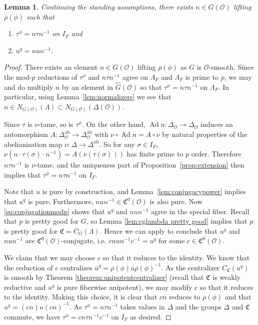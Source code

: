 \documentclass[11pt, letterpaper,english]{amsart}
\theoremstyle{plain}
\newtheorem{lemma}[lem]{Lemma}
\theoremstyle{definition}
\numberwithin{equation}{section}
\numberwithin{lem}{section}
\newcommand{\fC}{\mathfrak{C}}
\newcommand{\cO}{\mathcal{O}}
\newcommand{\rhobar}{{\overline{\rho}}}
\newcommand{\ab}{\textrm{ab}}
\DeclareMathOperator{\Ad}{Ad}
\newcommand{\cent}[2]{C_{#1}(#2)}
\newcommand{\Ld}{\Lambda}
\newcommand{\Dt}{\Delta}
\begin{document}
\begin{lemma} \label{lemma:nlifting}
Continuing the standing assumptions, there exists $n \in G(\cO)$ lifting $\rhobar(\phi)$ such that 
\begin{enumerate}
    \item $\tau^\phi = n \tau n^{-1}$ on $I_F$ and
    \item  $u^q = n u n^{-1}$.
\end{enumerate}
\end{lemma}

\begin{proof}
There exists an element $n \in G(\cO)$ lifting $\rhobar(\phi)$ as $G$ is $\cO$-smooth. Since the mod-$p$ reductions of $\tau^{\phi}$ and $n \tau n^{-1}$ agree on $\Ld_F$ and $\Ld_F$ is prime to $p$, we may and do multiply $n$ by an element in $\widehat G(\cO)$ so that $\tau^{\phi}=n \tau n^{-1}$ on $\Ld_F$. In particular, using Lemma~\ref{lem:normalizers} we see that 
$n \in N_{G(\cO)}(\Ld) \subset N_{G(\cO)}(\Dt(\cO))$.

Since $\tau$ is $\nu$-tame, so is $\tau^{\phi}$. On the other hand, $\Ad n: \Dt_{\cO} \to \Dt_{\cO}$ induces an automorphism $A: \Dt^{\ab}_{\cO} \to \Dt^{\ab}_{\cO}$ with $\nu \circ \Ad n = A \circ \nu$ by natural properties of the abelianization map $\nu: \Dt \to \Dt^{\ab}$. So for any $\sigma \in I_F$, $\nu(n \cdot \tau(\sigma) \cdot n^{-1})=A(\nu(\tau(\sigma)))$ has finite prime to $p$ order. Therefore $n \tau n^{-1}$ is $\nu$-tame, and the uniqueness part of Proposition~\ref{prop:extension} then implies that $\tau^{\phi}=n \tau n^{-1}$ on $I_F$. 


Note that $u$ is pure by construction, and Lemma~\ref{lem:conjugacypower} implies that $u^q$ is pure. Furthermore, $n u n^{-1} \in \fC^0(\cO)$ is also pure.  
Now \eqref{eq:conjugationmodp} shows that $u^q$ and $n u n^{-1}$ agree in the special fiber.
Recall that $p$ is pretty good for $G$, so Lemma \ref{lem:cglambda pretty good} implies that $p$ is pretty good for $\fC=\cent{G}{\Ld}$.
Hence we can apply \cite[Theorem 5.11]{cotner} to conclude that $u^q$ and $n u n^{-1}$ are $\fC^0(\cO)$-conjugate, i.e. $c n u n^{-1} c^{-1} = u^q $ for some $c \in \fC^0(\cO)$.  

We claim that we may choose $c$ so that it reduces to the identity.  We know that the reduction of $c$ centralizes $\overline{u}^q = \rhobar(\phi) \overline{u} \rhobar(\phi)^{-1}$.  As the centralizer $C_{\fC}(u^q)$ is smooth by Theorem \ref{theorem:unipotentcentralizer} (recall that $\fC$ is weakly reductive and $u^q$ is pure fiberwise unipotent), we may modify $c$ so that it reduces to the identity.  
Making this choice, it is clear that $cn$ reduces to $\rhobar(\phi)$ and that $u^q = (cn) u (cn)^{-1}$.  As $\tau^{\phi}=n \tau n^{-1}$ takes values in $\Dt$ and the groups $\Dt$ and $\fC$ commute, we have $\tau^{\phi}=cn \tau n^{-1}c^{-1}$ on $I_F$ as desired.
\end{proof}
\end{document}
